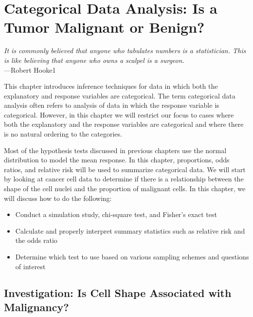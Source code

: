 \documentclass[
]{report}
\providecommand{\tightlist}{%
  \setlength{\itemsep}{0pt}\setlength{\parskip}{0pt}}
\begin{document}
\hypertarget{categorical-data-analysis-is-a-tumor-malignant-or-benign}{%
\chapter{Categorical Data Analysis: Is a Tumor Malignant or Benign?}\label{categorical-data-analysis-is-a-tumor-malignant-or-benign}}

{ \emph{It is commonly believed that anyone who tabulates numbers is a statistician. This is like believing that anyone who owns a scalpel is a surgeon.}}\\
{ ---Robert Hooke1}

This chapter introduces inference techniques for data in which both the explanatory and
response variables are categorical. The term categorical data analysis often refers to
analysis of data in which the response variable is categorical. However, in this chapter
we will restrict our focus to cases where both the explanatory and the response variables are
categorical and where there is no natural ordering to the categories.

Most of the hypothesis tests discussed in previous chapters use the normal distribution to
model the mean response. In this chapter, proportions, odds ratios, and relative risk will be
used to summarize categorical data. We will start by looking at cancer cell data to determine
if there is a relationship between the shape of the cell nuclei and the proportion of malignant
cells. In this chapter, we will discuss how to do the following:

\begin{itemize}
\tightlist
\item
  Conduct a simulation study, chi-square test, and Fisher's exact test
\item
  Calculate and properly interpret summary statistics such as relative risk and the odds ratio
\item
  Determine which test to use based on various sampling schemes and questions of interest
\end{itemize}

\hypertarget{investigation-is-cell-shape-associated-with-malignancy}{%
\section{\texorpdfstring{\textbf{Investigation: Is Cell Shape Associated with Malignancy?}}{Investigation: Is Cell Shape Associated with Malignancy?}}\label{investigation-is-cell-shape-associated-with-malignancy}}
\end{document}
